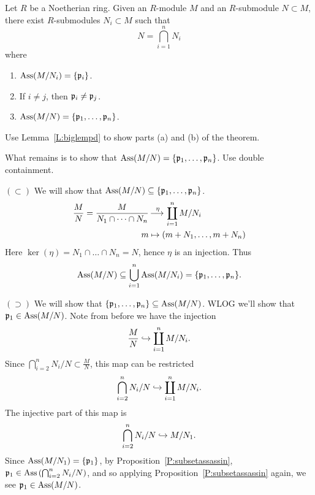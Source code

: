 \documentclass{ximera}
\begin{document}
\begin{theorem}\label{T:primarydecomp}
  Let $R$ be a Noetherian ring. Given an $R$-module $M$ and an
  $R$-submodule $N\subset M$, there exist $R$-submodules $N_i\subset
  M$ such that
  \[
  N = \bigcap_{i=1}^n N_i
  \]
  where
  \begin{enumerate}
  \item $\operatorname{Ass}(M/N_i) = \{\mathfrak{p}_i\}$.
  \item If $i\ne j$, then $\mathfrak{p}_i\ne\mathfrak{p}_j$.
  \item $\operatorname{Ass}(M/N) = \{\mathfrak{p}_1,\dots,\mathfrak{p}_n\}$.
  \end{enumerate}
  \begin{sketch}
    Use Lemma~\ref{L:biglempd} to show parts (a) and (b) of the
    theorem.
    
    What remains is to show that $\operatorname{Ass}(M/N) =
    \{\mathfrak{p}_1,\dots,\mathfrak{p}_n\}$. Use double containment.
    
    $(\subset)$ We will show that $\operatorname{Ass}(M/N)
    \subseteq\{\mathfrak{p}_1,\dots,\mathfrak{p}_n\}$.
    \begin{align*}
      \frac{M}{N} = \frac{M}{N_1\cap\dots\cap N_n} &\mathop{\longrightarrow\,}\limits^\eta \coprod_{i=1}^n M/N_i\\
        m &\mapsto (m + N_1,\dots, m+ N_n)
    \end{align*}
    Here $\ker(\eta) = N_1\cap\dots\cap N_n = N$, hence $\eta$ is an
    injection. Thus
    \[
    \operatorname{Ass}(M/N) \subseteq \bigcup_{i=1}^n \operatorname{Ass}(M/N_i) = \{\mathfrak{p}_1,\dots,\mathfrak{p}_n\}.
    \]


    $(\supset)$ We will show that $\{\mathfrak{p}_1,\dots,\mathfrak{p}_n\} \subseteq
    \operatorname{Ass}(M/N)$. WLOG we'll show that $\mathfrak{p}_1\in\operatorname{Ass}(M/N)$. Note from
    before we have the injection
    \[
    \frac{M}{N} \hookrightarrow \coprod_{i=1}^n M/N_i.
    \]
    Since $\bigcap_{i=2}^n N_i/N \subset \frac{M}{N}$, this map can be
    restricted
    \[
    \bigcap_{i=2}^n N_i/N \hookrightarrow \coprod_{i=1}^n M/N_i.
    \]
    The injective part of this map is
    \[
    \bigcap_{i=2}^n N_i/N \hookrightarrow M/N_1.
    \]
    Since $\operatorname{Ass}(M/N_1) = \{\mathfrak{p}_1\}$, by
    Proposition~\ref{P:subsetassassin},
    $\mathfrak{p}_1\in\operatorname{Ass}\left(\bigcap_{i=2}^n N_i/N\right)$, and so applying
    Proposition~\ref{P:subsetassassin} again, we see
    $\mathfrak{p}_1\in\operatorname{Ass}(M/N)$.
  \end{sketch}
\end{theorem}
\end{document}
